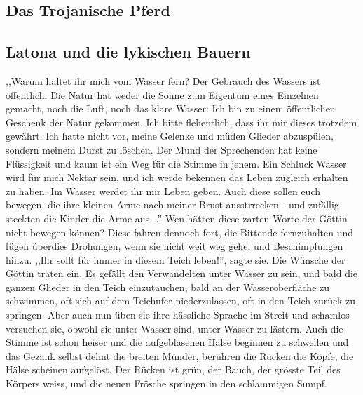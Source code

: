 \documentclass[a4paper]{article}
\begin{document}
\subsection{Das Trojanische Pferd}

\subsection{Latona und die lykischen Bauern}
,,Warum haltet ihr mich vom Wasser fern? Der Gebrauch des Wassers ist öffentlich. Die Natur hat weder die Sonne zum Eigentum eines Einzelnen gemacht, noch die Luft, noch das klare Wasser: Ich bin zu einem öffentlichen Geschenk der Natur gekommen. Ich bitte flehentlich, dass ihr mir dieses trotzdem gewährt. Ich hatte nicht vor, meine Gelenke und müden Glieder abzuspülen, sondern meinem Durst zu löschen. Der Mund der Sprechenden hat keine Flüssigkeit und kaum ist ein Weg für die Stimme in jenem. Ein Schluck Wasser wird für mich Nektar sein, und ich werde bekennen das Leben zugleich erhalten zu haben. Im Wasser werdet ihr mir Leben geben. Auch diese sollen euch bewegen, die ihre kleinen Arme nach meiner Brust ausstrrecken - und zufällig steckten die Kinder die Arme aus -.'' Wen hätten diese zarten Worte der Göttin nicht bewegen können? Diese fahren dennoch fort, die Bittende fernzuhalten und fügen überdies Drohungen, wenn sie nicht weit weg gehe, und Beschimpfungen hinzu. ,,Ihr sollt für immer in diesem Teich leben!'', sagte sie. Die Wünsche der Göttin traten ein. Es gefällt den Verwandelten unter Wasser zu sein, und bald die ganzen Glieder in den Teich einzutauchen, bald an der Wasseroberfläche zu schwimmen, oft sich auf dem Teichufer niederzulassen, oft in den Teich zurück zu springen. Aber auch nun üben sie ihre hässliche Sprache im Streit und schamlos versuchen sie, obwohl sie unter Wasser sind, unter Wasser zu lästern. Auch die Stimme ist schon heiser und die aufgeblasenen Hälse beginnen zu schwellen und das Gezänk selbst dehnt die breiten Münder, berühren die Rücken die Köpfe, die Hälse scheinen aufgelöst. Der Rücken ist grün, der Bauch, der grösste Teil des Körpers weiss, und die neuen Frösche springen in den schlammigen Sumpf.
\end{document}
